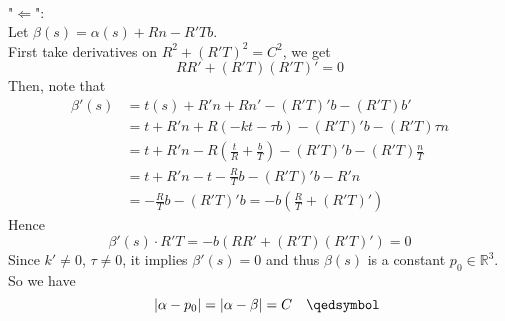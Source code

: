 \documentclass{article}
\begin{document}
\\
"$\Leftarrow$":\\
Let $\beta(s) = \alpha(s) + Rn - R'Tb$.\\
First take derivatives on $R^2 + (R'T)^2 = C^2$, we get
$$
    RR' + (R'T)(R'T)' = 0
$$
Then, note that
$$
\begin{aligned}
    \beta'(s) &= t(s) + R'n + Rn' - (R'T)'b - (R'T)b' \\
    &= t + R'n + R(-kt-\tau b) - (R'T)'b - (R'T)\tau n\\
    &= t + R'n - R(\frac{t}{R} + \frac{b}{T}) - (R'T)'b - (R'T)\frac{n}{T}\\
    &= t + R'n - t - \frac{R}{T}b - (R'T)'b - R'n\\
    &= -\frac{R}{T}b - (R'T)'b = -b(\frac{R}{T} + (R'T)')
\end{aligned}
$$
Hence
$$
    \beta'(s) \cdot R'T = -b(RR' + (R'T)(R'T)') = 0
$$
Since $k' \neq 0$, $\tau \neq 0$, it implies $\beta'(s) = 0$ and thus $\beta(s)$ is
a constant $p_0 \in \mathbb{R}^3$. So we have
$$
    \quad |\alpha - p_0| = |\alpha - \beta| = C \quad \qedsymbol
$$
\end{document}

